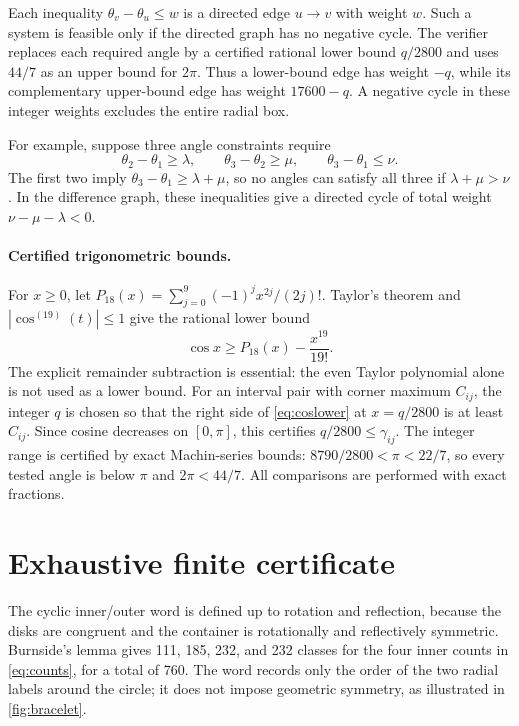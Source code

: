 \documentclass[11pt]{article}
\theoremstyle{definition}
\begin{document}
Each inequality $\theta_v-\theta_u\le w$ is a directed edge $u\to v$ with weight $w$. Such a system is feasible only if the directed graph has no negative cycle. The verifier replaces each required angle by a certified rational lower bound $q/2800$ and uses $44/7$ as an upper bound for $2\pi$. Thus a lower-bound edge has weight $-q$, while its complementary upper-bound edge has weight $17600-q$. A negative cycle in these integer weights excludes the entire radial box.

For example, suppose three angle constraints require
\[
 \theta_2-\theta_1\ge\lambda,\qquad
 \theta_3-\theta_2\ge\mu,\qquad
 \theta_3-\theta_1\le\nu.
\]
The first two imply $\theta_3-\theta_1\ge\lambda+\mu$, so no angles can satisfy all three if $\lambda+\mu>\nu$. In the difference graph, these inequalities give a directed cycle of total weight $\nu-\mu-\lambda<0$.



\paragraph{Certified trigonometric bounds.}
For $x\ge0$, let $P_{18}(x)=\sum_{j=0}^{9}(-1)^j x^{2j}/(2j)!$. Taylor's theorem and $|\cos^{(19)}(t)|\le1$ give the rational lower bound
\begin{equation}\label{eq:coslower}
 \cos x\ge P_{18}(x)-\frac{x^{19}}{19!}.
\end{equation}
The explicit remainder subtraction is essential: the even Taylor polynomial alone is not used as a lower bound. For an interval pair with corner maximum $C_{ij}$, the integer $q$ is chosen so that the right side of \eqref{eq:coslower} at $x=q/2800$ is at least $C_{ij}$. Since cosine decreases on $[0,\pi]$, this certifies $q/2800\le\gamma_{ij}$. The integer range is certified by exact Machin-series bounds: \(8790/2800<\pi<22/7\), so every tested angle is below $\pi$ and $2\pi<44/7$. All comparisons are performed with exact fractions.

\section{Exhaustive finite certificate}\label{sec:certificate}

The cyclic inner/outer word is defined up to rotation and reflection, because the disks are congruent and the container is rotationally and reflectively symmetric. Burnside's lemma gives 111, 185, 232, and 232 classes for the four inner counts in \cref{eq:counts}, for a total of 760. The word records only the order of the two radial labels around the circle; it does not impose geometric symmetry, as illustrated in \cref{fig:bracelet}.
\end{document}
